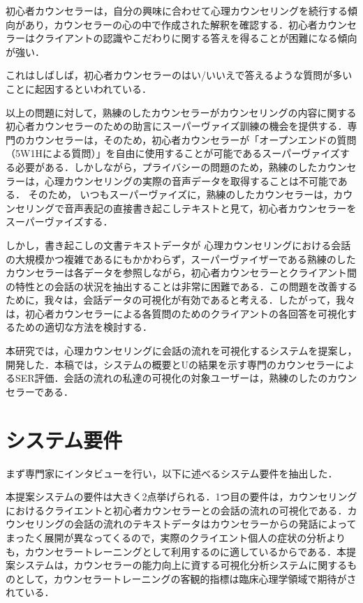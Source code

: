\documentclass[shuuron]{kuee}
\begin{document}
初心者カウンセラーは，自分の興味に合わせて心理カウンセリングを続行する傾向があり，カウンセラーの心の中で作成された解釈を確認する．初心者カウンセラーはクライアントの認識やこだわりに関する答えを得ることが困難になる傾向が強い．

これはしばしば，初心者カウンセラーのはい/いいえで答えるような質問が多いことに起因するといわれている．

以上の問題に対して，熟練のしたカウンセラーがカウンセリングの内容に関する初心者カウンセラーのための助言にスーパーヴァイズ訓練の機会を提供する．専門のカウンセラーは，そのため，初心者カウンセラーが「オープンエンドの質問（5W1Hによる質問）」を自由に使用することが可能であるスーパーヴァイズする必要がある．しかしながら，プライバシーの問題のため，熟練のしたカウンセラーは，心理カウンセリングの実際の音声データを取得することは不可能である． そのため， いつもスーパーヴァイズに，熟練のしたカウンセラーは，カウンセリングで音声表記の直接書き起こしテキストと見て，初心者カウンセラーをスーパーヴァイズする．

しかし，書き起こしの文書テキストデータが 心理カウンセリングにおける会話の大規模かつ複雑であるにもかかわらず，スーパーヴァイザーである熟練のしたカウンセラーは各データを参照しながら，初心者カウンセラーとクライアント間の特性との会話の状況を抽出することは非常に困難である．この問題を改善するために，我々は，会話データの可視化が有効であると考える．したがって，我々は，初心者カウンセラーによる各質問のためのクライアントの各回答を可視化するための適切な方法を検討する．

本研究では，心理カウンセリングに会話の流れを可視化するシステムを提案し，開発した．本稿では，システムの概要とUの結果を示す専門のカウンセラーによるSER評価．会話の流れの私達の可視化の対象ユーザーは，熟練のしたのカウンセラーである．




\section{システム要件}




まず専門家にインタビューを行い，以下に述べるシステム要件を抽出した．




本提案システムの要件は大きく2点挙げられる．1つ目の要件は，カウンセリングにおけるクライエントと初心者カウンセラーとの会話の流れの可視化である．カウンセリングの会話の流れのテキストデータはカウンセラーからの発話によってまったく展開が異なってくるので，実際のクライエント個人の症状の分析よりも，カウンセラートレーニングとして利用するのに適しているからである．本提案システムは，カウンセラーの能力向上に資する可視化分析システムに関するものとして，カウンセラートレーニングの客観的指標は臨床心理学領域で期待がされている．
\end{document}
